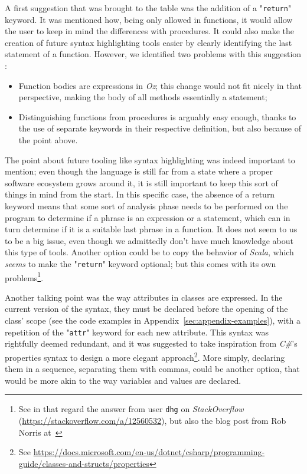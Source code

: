 A first suggestion that was brought to the table was the addition of a "\texttt{return}" keyword.
It was mentioned how, being only allowed in functions, it would allow the user to keep in mind the differences with procedures.
It could also make the creation of future syntax highlighting tools easier by clearly identifying the last statement of a function.
However, we identified two problems with this suggestion :
\begin{itemize}
    \item Function bodies are expressions in \textit{Oz}; this change would not fit nicely in that perspective, making the body of all methods essentially a statement;
    \item Distinguishing functions from procedures is arguably easy enough, thanks to the use of separate keywords in their respective definition, but also because of the point above.
\end{itemize}
The point about future tooling like syntax highlighting was indeed important to mention;
even though the language is still far from a state where a proper software ecosystem grows around it, it is still important to keep this sort of things in mind from the start.
In this specific case, the absence of a return keyword means that some sort of analysis phase needs to be performed on the program to determine if a phrase is an expression or a statement, which can in turn determine if it is a suitable last phrase in a function.
It does not seem to us to be a big issue, even though we admittedly don't have much knowledge about this type of tools.
Another option could be to copy the behavior of \textit{Scala}, which \emph{seems} to make the "\texttt{return}" keyword optional;
but this comes with its own problems\footnote{See in that regard the answer from user \texttt{dhg} on \textit{StackOverflow} (\url{https://stackoverflow.com/a/12560532}), but also the blog post from Rob Norris at~\cite{returnscala}}.\newline

Another talking point was the way attributes in classes are expressed.
In the current version of the syntax, they must be declared before the opening of the class' scope (see the code examples in Appendix~\ref{sec:appendix-examples}), with a repetition of the "\texttt{attr}" keyword for each new attribute.
This syntax was rightfully deemed redundant, and it was suggested to take inspiration from \textit{C\#}'s properties syntax to design a more elegant approach\footnote{See \url{https://docs.microsoft.com/en-us/dotnet/csharp/programming-guide/classes-and-structs/properties}}.
More simply, declaring them in a sequence, separating them with commas, could be another option, that would be more akin to the way variables and values are declared.\newline

